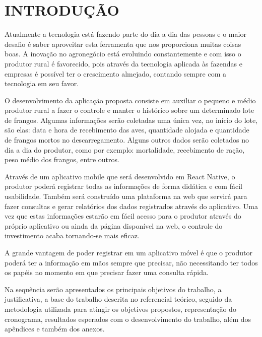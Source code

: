 
\chapter{INTRODUÇÃO}
\label{chap:introducao}




Atualmente a tecnologia está fazendo parte do dia a dia das pessoas e o maior desafio é saber aproveitar esta ferramenta que nos proporciona muitas coisas boas. A inovação no agronegócio está evoluindo constantemente e com isso o produtor rural é favorecido, pois através da tecnologia aplicada às fazendas e empresas é possível ter o crescimento almejado, contando sempre com a tecnologia em seu favor.

O desenvolvimento da aplicação proposta consiste em auxiliar o pequeno e médio produtor rural a fazer o controle e manter o histórico sobre um determinado lote de frangos. Algumas informações serão coletadas uma única vez, no início do lote, são elas: data e hora de recebimento das aves, quantidade alojada e quantidade de frangos mortos no descarregamento. Alguns outros dados serão coletados no dia a dia do produtor, como por exemplo: mortalidade, recebimento de ração, peso médio dos frangos, entre outros.

Através de um aplicativo mobile que será desenvolvido em React Native, o produtor poderá registrar todas as informações de forma didática e com fácil usabilidade. Também será construído uma plataforma na web que servirá para fazer consultas e gerar relatórios dos dados registrados através do aplicativo.
Uma vez que estas informações estarão em fácil acesso para o produtor através do próprio aplicativo ou ainda da página disponível na web, o controle do investimento acaba tornando-se mais eficaz.


A grande vantagem de poder registrar em um aplicativo móvel é que o produtor poderá ter a informação em mãos sempre que precisar, não necessitando ter todos os papéis no momento em que precisar fazer uma consulta rápida.

Na sequência serão apresentados os principais objetivos do trabalho, a justificativa, a base do trabalho descrita no referencial teórico, seguido da metodologia utilizada para atingir os objetivos propostos, representação do cronograma, resultados esperados com o desenvolvimento do trabalho, além dos apêndices e também dos anexos.